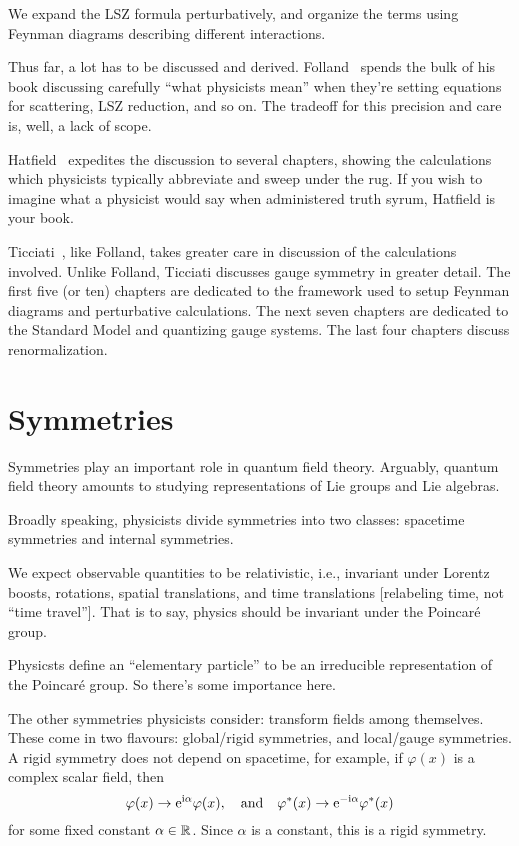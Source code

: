 We expand the LSZ formula perturbatively, and organize the terms using
Feynman diagrams describing different interactions.

Thus far, a lot has to be discussed and derived. Folland~\cite{Folland:2008zz}
spends the bulk of his book discussing carefully ``what physicists mean''
when they're setting equations for scattering, LSZ reduction, and so on.
The tradeoff for this precision and care is, well, a lack of scope.

Hatfield~\cite{Hatfield:1992rz} expedites the discussion to several
chapters, showing the calculations which physicists typically abbreviate
and sweep under the rug. If you wish to imagine what a physicist would
say when administered truth syrum, Hatfield is your book.

Ticciati~\cite{Ticciati:1999qp}, like Folland, takes greater care in
discussion of the calculations involved. Unlike Folland, Ticciati
discusses gauge symmetry in greater detail. The first five (or ten)
chapters are dedicated to the framework used to setup Feynman diagrams
and perturbative calculations. The next seven chapters are dedicated to
the Standard Model and quantizing gauge systems. The last four chapters
discuss renormalization.

\section{Symmetries}

\M
Symmetries play an important role in quantum field theory. Arguably,
quantum field theory amounts to studying representations of Lie groups
and Lie algebras.

Broadly speaking, physicists divide symmetries into two classes:
spacetime symmetries and internal symmetries.

We expect observable quantities to be relativistic, i.e., invariant
under Lorentz boosts, rotations, spatial translations, and time
translations [relabeling time, not ``time travel'']. That is to say,
physics should be invariant under the Poincar\'e group.

\M
Physicsts define an ``elementary particle'' to be an irreducible
representation of the Poincar\'e group. So there's some importance here.

The other symmetries physicists consider: transform fields among
themselves. These come in two flavours: global/rigid symmetries, and
local/gauge symmetries. A rigid symmetry does not depend on spacetime,
for example, if $\varphi(x)$ is a complex scalar field, then
\begin{equation}
\varphi(x)\to\mathrm{e}^{\mathrm{i}\alpha}\varphi(x),\quad\mbox{and}\quad
\varphi^{*}(x)\to\mathrm{e}^{-\mathrm{i}\alpha}\varphi^{*}(x)
\end{equation}
for some fixed constant $\alpha\in\mathbb{R}$. Since $\alpha$ is a constant,
this is a rigid symmetry.

